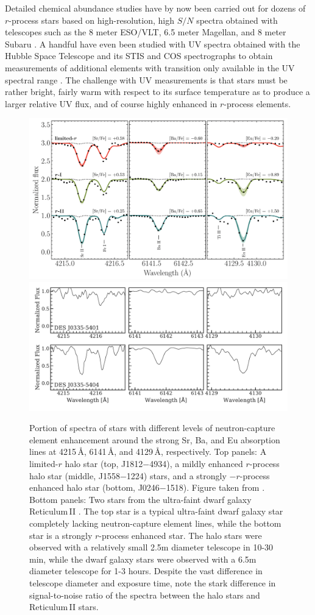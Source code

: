 \documentclass[letterpaper]{article}
\begin{document}
Detailed chemical abundance studies have by now been carried out for dozens of $r$-process stars based on high-resolution, high $S/N$ spectra obtained with telescopes such as the 8 meter ESO/VLT, 6.5 meter Magellan, and 8 meter Subaru \citep{Christlieb04, Honda05, holmbeck18, placco2020, cain20}. A handful have even been studied with UV spectra obtained with the Hubble Space Telescope and its STIS and COS spectrographs to obtain measurements of additional elements with transition only available in the UV spectral range \citep{Roederer2012, roederer2014phos, Roederer18_hd}. The challenge with UV measurements is that stars must be rather bright, fairly warm with respect to its surface temperature as to produce a larger relative UV flux, and of course highly enhanced in $r$-process elements. 


\begin{figure}
\centering
    \includegraphics[width=0.7\linewidth]{figures/Hansen2018_spectra.png} \\
    \includegraphics[width=0.7\linewidth]{figures/ret2_spectra.pdf}
    \caption{Portion of spectra of stars with different levels of neutron-capture element enhancement around the strong Sr, Ba, and Eu absorption lines at 4215\,{\AA}, 6141\,{\AA}, and 4129\,{\AA}, respectively. Top panels: A limited-$r$ halo star (top, J1812$-$4934), a mildly enhanced $r$-process halo star (middle, J1558$-$1224) stars, and a strongly $-r$-process enhanced halo star (bottom, J0246$-$1518). Figure taken from \citet{Hansen2018}. 
    Bottom panels:
    Two stars from the ultra-faint dwarf galaxy Reticulum\,II \citep{Ji2016b}. The top star is a typical ultra-faint dwarf galaxy star completely lacking neutron-capture element lines, while the bottom star is a strongly $r$-process enhanced star. The halo stars were observed with a relatively small 2.5m diameter telescope in 10-30 min, while the dwarf galaxy stars were observed with a 6.5m diameter telescope for 1-3 hours. Despite the vast difference in telescope diameter and exposure time, note the stark difference in signal-to-noise ratio of the spectra between the halo stars and Reticulum\,II stars.
    }
    \label{fig:spectra}
\end{figure}
\end{document}
